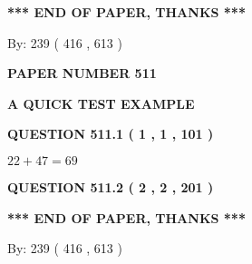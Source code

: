 \documentclass[12pt]{article}
\begin{document}
   
 \vspace{0.2in}
 
   
   
   
   
\vspace{1.0in} 
{\textbf{\large{ *** END OF PAPER, THANKS *** }}} 
   
   
\hspace{1.0in} By: 
 239 ( 416 ,  613 )
   
   
   
   
\newpage 
\setcounter{page}{ 
   511001 } 
   
   
   
   
 {\textbf{ \Large{ PAPER NUMBER  511  }}}
   
   
\vspace{0.2in}
   
   
   
   
   
   
 \vspace{0.2in}
{\LARGE {\textbf{ A QUICK TEST EXAMPLE}}}
   
   
  
\vspace{0.2in}
  
{\textbf{\Large{QUESTION
511.1 
 ( 1 , 1 , 101 )
}}}
  
  
 
 

$ %
22 +  %
47=   %
69$
 
 
  
\vspace{0.2in}
  
{\textbf{\Large{QUESTION
511.2 
 ( 2 , 2 , 201 )
}}}
  
  
   
   
 \vspace{0.2in}
 
   
   
   
   
\vspace{1.0in} 
{\textbf{\large{ *** END OF PAPER, THANKS *** }}} 
   
   
\hspace{1.0in} By: 
 239 ( 416 ,  613 )
   
   
   
   
\newpage 
\setcounter{page}{ 
   512001 } 
   
   
   
\end{document}

